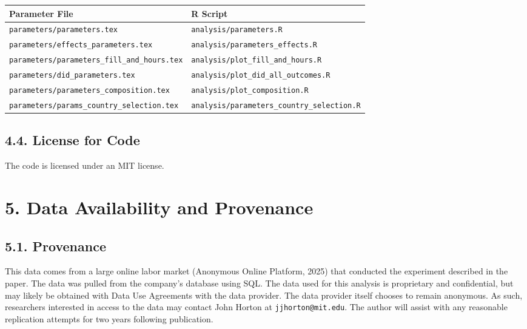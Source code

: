 \documentclass[10pt]{article}
\newenvironment{eightpt}{\begingroup\fontsize{8}{13}\selectfont}{\endgroup}
\begin{document}
\begin{eightpt}
\begin{tabularx}{\textwidth}{@{}LL@{}}
\toprule
Parameter File & R Script \\
\midrule
\texttt{parameters/parameters.tex} & \texttt{analysis/parameters.R} \\
\texttt{parameters/effects\_parameters.tex} & \texttt{analysis/parameters\_effects.R} \\
\texttt{parameters/parameters\_fill\_and\_hours.tex} & \texttt{analysis/plot\_fill\_and\_hours.R} \\
\texttt{parameters/did\_parameters.tex} & \texttt{analysis/plot\_did\_all\_outcomes.R} \\
\texttt{parameters/parameters\_composition.tex} & \texttt{analysis/plot\_composition.R} \\
\texttt{parameters/params\_country\_selection.tex} & \texttt{analysis/parameters\_country\_selection.R} \\
\bottomrule
\end{tabularx}
\end{eightpt}

\subsection*{4.4. License for Code}

The code is licensed under an MIT license.

\vspace{1em}
\section*{5. Data Availability and Provenance}

\subsection*{5.1. Provenance}

This data comes from a large online labor market (Anonymous Online Platform, 2025) that conducted the experiment described in the paper. 
The data was pulled from the company's database using SQL. 
The data used for this analysis is proprietary and confidential, but may likely be obtained with Data Use Agreements with the data provider.
The data provider itself chooses to remain anonymous.
As such, researchers interested in access to the data may contact John Horton at \texttt{jjhorton@mit.edu}. 
The author will assist with any reasonable replication attempts for two years following publication.
\end{document}

